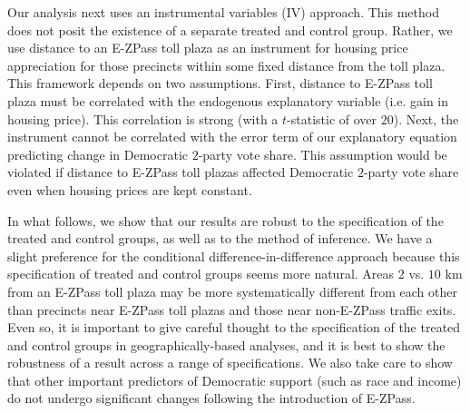 Our analysis next uses an instrumental variables (IV) approach. This method does not posit the existence of a separate treated and control group. Rather, we use distance to an E-ZPass toll plaza as an instrument for housing price appreciation for those precincts within some fixed distance from the toll plaza. This framework depends on two assumptions. First, distance to E-ZPass toll plaza must be correlated with the endogenous explanatory variable (i.e. gain in housing price). This correlation is strong (with a $t$-statistic of over $20$). Next, the instrument cannot be correlated with the error term of our explanatory equation predicting change in Democratic $2$-party vote share. This assumption would be violated if distance to E-ZPass toll plazas affected Democratic $2$-party vote share even when housing prices are kept constant. 

In what follows, we show that our results are robust to the specification of the treated and control groups, as well as to the method of inference. We have a slight preference for the conditional difference-in-difference approach because this specification of treated and control groups seems more natural. Areas $2$ vs. $10$ km from an E-ZPass toll plaza may be more systematically different from each other than precincts near E-ZPass toll plazas and those near non-E-ZPass traffic exits. Even so, it is important to give careful thought to the specification of the treated and control groups in geographically-based analyses, and it is best to show the robustness of a result across a range of specifications.  We also take care to show that other important predictors of Democratic support (such as race and income) do not undergo significant changes following the introduction of E-ZPass. 